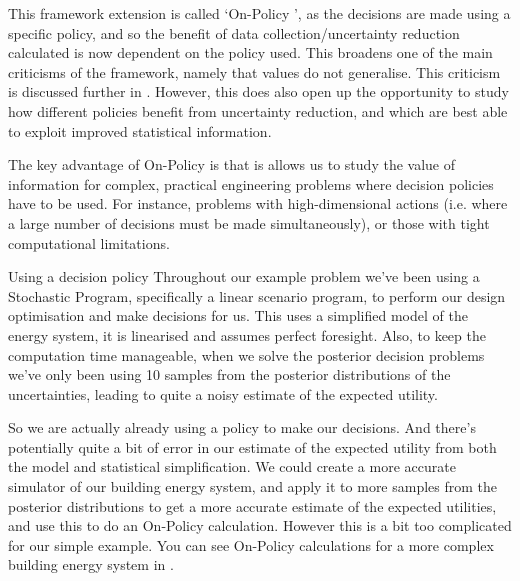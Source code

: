 This framework extension is called `On-Policy ', as the decisions are made using a specific policy, and so the benefit of data collection/uncertainty reduction calculated is now dependent on the policy used. This broadens one of the main criticisms of the  framework, namely that  values do not generalise. This criticism is discussed further in . However, this does also open up the opportunity to study how different policies benefit from uncertainty reduction, and which are best able to exploit improved statistical information.

The key advantage of On-Policy  is that is allows us to study the value of information for complex, practical engineering problems where decision policies have to be used. For instance, problems with high-dimensional actions (i.e. where a large number of decisions must be made simultaneously), or those with tight computational limitations.\\

\begin{ebox}{Using a decision policy}
    Throughout our example problem we've been using a Stochastic Program, specifically a linear scenario program, to perform our design optimisation and make decisions for us. This  uses a simplified model of the energy system, it is linearised and assumes perfect foresight. Also, to keep the computation time manageable, when we solve the posterior decision problems we've only been using 10 samples from the posterior distributions of the uncertainties, leading to quite a noisy estimate of the expected utility.

    So we are actually already using a policy to make our decisions. And there's potentially quite a bit of error in our estimate of the expected utility from both the model and statistical simplification. We could create a more accurate simulator of our building energy system, and apply it to more samples from the posterior distributions to get a more accurate estimate of the expected utilities, and use this to do an On-Policy  calculation. However this is a bit too complicated for our simple example.
    You can see On-Policy  calculations for a more complex building energy system in .
\end{ebox}


\subsection{} \label{sec:methodology-optionality}

